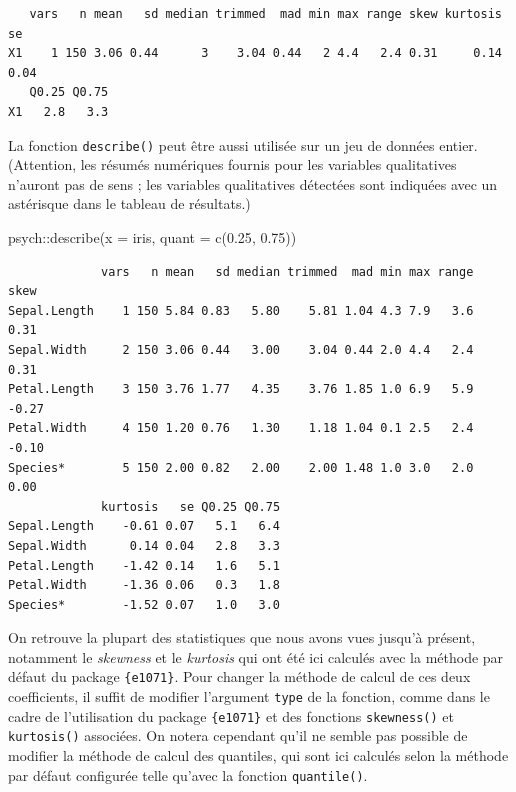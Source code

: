 \documentclass[
  letterpaper,
]{book}
\newenvironment{Shaded}{\begin{snugshade}}{\end{snugshade}}
\newcommand{\AttributeTok}[1]{\textcolor[rgb]{0.40,0.45,0.13}{#1}}
\newcommand{\FloatTok}[1]{\textcolor[rgb]{0.68,0.00,0.00}{#1}}
\newcommand{\FunctionTok}[1]{\textcolor[rgb]{0.28,0.35,0.67}{#1}}
\newcommand{\NormalTok}[1]{\textcolor[rgb]{0.00,0.23,0.31}{#1}}
\newcommand{\SpecialCharTok}[1]{\textcolor[rgb]{0.37,0.37,0.37}{#1}}
\begin{document}
\begin{verbatim}
   vars   n mean   sd median trimmed  mad min max range skew kurtosis   se
X1    1 150 3.06 0.44      3    3.04 0.44   2 4.4   2.4 0.31     0.14 0.04
   Q0.25 Q0.75
X1   2.8   3.3
\end{verbatim}

La fonction \texttt{describe()} peut être aussi utilisée sur un jeu de
données entier. (Attention, les résumés numériques fournis pour les
variables qualitatives n'auront pas de sens ; les variables qualitatives
détectées sont indiquées avec un astérisque dans le tableau de
résultats.)

\begin{Shaded}
\begin{Highlighting}[]
\NormalTok{psych}\SpecialCharTok{::}\FunctionTok{describe}\NormalTok{(}\AttributeTok{x =}\NormalTok{ iris, }\AttributeTok{quant =} \FunctionTok{c}\NormalTok{(}\FloatTok{0.25}\NormalTok{, }\FloatTok{0.75}\NormalTok{))}
\end{Highlighting}
\end{Shaded}

\begin{verbatim}
             vars   n mean   sd median trimmed  mad min max range  skew
Sepal.Length    1 150 5.84 0.83   5.80    5.81 1.04 4.3 7.9   3.6  0.31
Sepal.Width     2 150 3.06 0.44   3.00    3.04 0.44 2.0 4.4   2.4  0.31
Petal.Length    3 150 3.76 1.77   4.35    3.76 1.85 1.0 6.9   5.9 -0.27
Petal.Width     4 150 1.20 0.76   1.30    1.18 1.04 0.1 2.5   2.4 -0.10
Species*        5 150 2.00 0.82   2.00    2.00 1.48 1.0 3.0   2.0  0.00
             kurtosis   se Q0.25 Q0.75
Sepal.Length    -0.61 0.07   5.1   6.4
Sepal.Width      0.14 0.04   2.8   3.3
Petal.Length    -1.42 0.14   1.6   5.1
Petal.Width     -1.36 0.06   0.3   1.8
Species*        -1.52 0.07   1.0   3.0
\end{verbatim}

On retrouve la plupart des statistiques que nous avons vues jusqu'à
présent, notamment le \emph{skewness} et le \emph{kurtosis} qui ont été
ici calculés avec la méthode par défaut du package \texttt{\{e1071\}}.
Pour changer la méthode de calcul de ces deux coefficients, il suffit de
modifier l'argument \texttt{type} de la fonction, comme dans le cadre de
l'utilisation du package \texttt{\{e1071\}} et des fonctions
\texttt{skewness()} et \texttt{kurtosis()} associées. On notera
cependant qu'il ne semble pas possible de modifier la méthode de calcul
des quantiles, qui sont ici calculés selon la méthode par défaut
configurée telle qu'avec la fonction \texttt{quantile()}.
\end{document}
